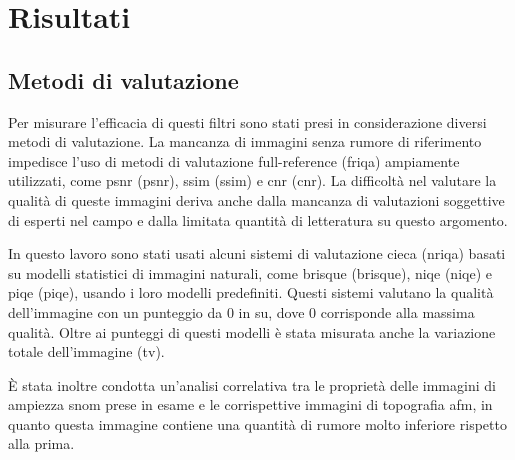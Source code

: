 \documentclass[../main.tex]{subfiles}
\begin{document}
\chapter{Risultati}

\section{Metodi di valutazione}

Per misurare l'efficacia di questi filtri sono stati presi in considerazione diversi metodi di valutazione. La mancanza di immagini senza rumore di riferimento impedisce l'uso di metodi di valutazione full-reference (\acrshort{friqa}) ampiamente utilizzati, come \acrshort{psnr}\cite{korhonen_2012} (\acrlong{psnr}), \acrshort{ssim}\cite{wang_2004} (\acrlong{ssim}) e \acrshort{cnr}\cite{rodriguez_2018} (\acrlong{cnr}). La difficoltà nel valutare la qualità di queste immagini deriva anche dalla mancanza di valutazioni soggettive di esperti nel campo e dalla limitata quantità di letteratura su questo argomento.

In questo lavoro sono stati usati alcuni sistemi di valutazione cieca (\acrshort{nriqa}) basati su modelli statistici di immagini naturali, come \acrshort{brisque}\cite{mittal_2011} (\acrlong{brisque}), \acrshort{niqe}\cite{mittal_2013} (\acrlong{niqe}) e \acrshort{piqe}\cite{venkatanath_2015} (\acrlong{piqe}), usando i loro modelli predefiniti. Questi sistemi valutano la qualità dell'immagine con un punteggio da 0 in su, dove 0 corrisponde alla massima qualità. Oltre ai punteggi di questi modelli è stata misurata anche la variazione totale dell'immagine (\acrshort{tv}).

È stata inoltre condotta un'analisi correlativa tra le proprietà delle immagini di ampiezza \acrshort{snom} prese in esame e le corrispettive immagini di topografia \acrshort{afm}, in quanto questa immagine contiene una quantità di rumore molto inferiore rispetto alla prima.
\end{document}
